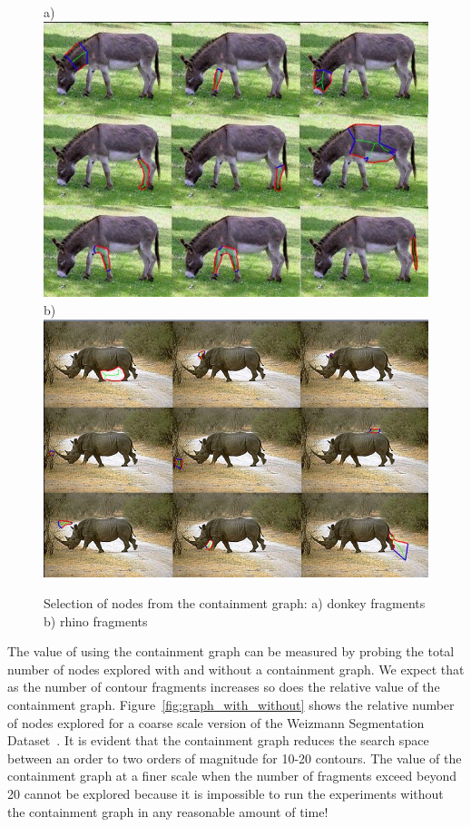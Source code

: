 \begin{figure}[h]
a) \includegraphics[width=0.43\linewidth]{figs/donkey-fragments-good.jpg}
b)\includegraphics[width=0.43\linewidth]{figs/rhino-fragments-background.jpg}
\caption{Selection of nodes from the containment graph: 
a) donkey fragments b) rhino fragments }
  \label{fig:donkey:fragments}
\end{figure}

The value of using the containment graph can be measured by probing the total number of nodes explored with and without a containment graph. We expect that as the number of contour fragments increases so does the relative value of the containment graph. Figure~\ref{fig:graph_with_without} shows the relative number of nodes explored for a coarse scale version of the Weizmann Segmentation Dataset~\cite{Alpert:etal:CVPR07}. It is evident that the containment graph reduces the search space between an order to two orders of magnitude for 10-20 contours. The value of the containment graph at a finer scale when the number of fragments exceed beyond 20 cannot be explored because it is impossible to run the experiments without the containment graph in any reasonable amount of time! 

